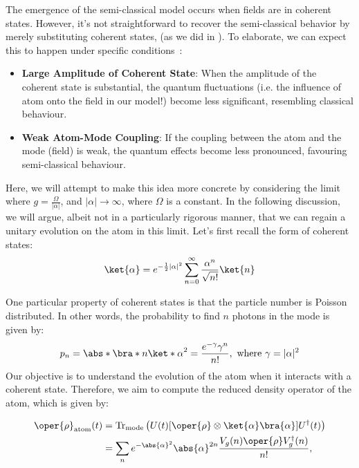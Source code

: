 The emergence of the semi-classical model occurs when fields are in
coherent states. However, it's not straightforward to recover the 
semi-classical behavior by merely substituting coherent states, (as we did in ). 
To elaborate, we can expect this to happen under specific conditions~\cite{semiclassical_limit_JC_PRL}:
\begin{itemize}
    \item \textbf{Large Amplitude of Coherent State}: When the amplitude of the coherent state is substantial, 
    the quantum fluctuations (i.e. the influence of atom onto the field in our model!) become less significant, 
    resembling classical behaviour.
    \item \textbf{Weak Atom-Mode Coupling}: If the coupling between the atom and the mode (field) is weak, 
    the quantum effects become less pronounced, favouring semi-classical behaviour.
\end{itemize}
Here, we will attempt to make this idea more concrete by considering the 
limit where $g = \frac{\Omega}{|\alpha|}$, and $|\alpha| \rightarrow \infty$, where 
$\Omega$ is a constant. In the following discussion, we will argue, albeit not in a particularly rigorous manner, that we can regain a unitary evolution on the atom in this limit. Let's first recall the form of coherent states:
\begin{equation}
    \ket{\alpha} = e^{-\frac{1}{2}|\alpha|^2} \sum_{n=0}^{\infty} \frac{\alpha^n}{\sqrt{n!}} \ket{n}
\end{equation}
    
One particular property of coherent states is that the particle number is Poisson distributed. In other words, the probability to find $n$ photons in the mode is given by:
\begin{equation}
    p_n = \abs*{\bra*{n}\ket*{\alpha}}^2 = \frac{e^{-\gamma} \gamma^n}{n!}, \text{ where } \gamma = |\alpha|^2
\end{equation}
Our objective is to understand the evolution of the atom when it interacts with a coherent state. 
Therefore, we aim to compute the reduced density operator of the atom, which is given by:

\begin{align}
\oper{\rho}_{\text{atom}}(t) &= 
\text{Tr}_{\text{mode}} \left( U(t)[\oper{\rho} \otimes \ket{\alpha}\bra{\alpha}]U^\dagger(t) \right) \nonumber \\
 &= \sum_n e^{-\abs{\alpha}^2} \abs{\alpha}^{2n} \frac{V_g(n)\oper{\rho} V_g^\dagger(n)}{n!},
\end{align}

